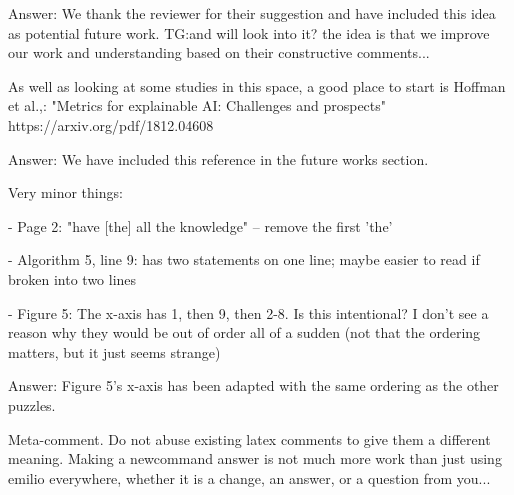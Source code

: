 \documentclass{article}
\newcommand\comment[1]{\marginpar{\tiny #1}}
\renewcommand\comment[1]{#1}
\newcommand{\tias}[1]{{\comment{\color{blue}\textsc{TG:}#1}}}
\newcommand{\emilio}[1]{{\comment{Answer: \color{red}#1}}}
\newcommand{\bart}[1]{{\comment{\color{green}#1}}}
\begin{document}
\emilio{We thank the reviewer for their suggestion and have included this idea as potential future work.} \tias{and will look into it? the idea is that we improve our work and understanding based on their constructive comments...}


\begin{quoteit}
As well as looking at some studies in this space, a good place to start is Hoffman et al.,: "Metrics for explainable AI: Challenges and prospects" https://arxiv.org/pdf/1812.04608 
\end{quoteit}

\emilio{We have included this reference in the future works section.}

Very minor things:

- Page 2: "have [the] all the knowledge" -- remove the first 'the'

- Algorithm 5, line 9: has two statements on one line; maybe easier to
read if broken into two lines

- Figure 5: The x-axis has 1, then 9, then 2-8. Is this intentional? I
don't see a reason why they would be out of order all of a sudden (not
that the ordering matters, but it just seems strange)

\emilio{Figure 5's x-axis has been adapted with the same ordering as the other puzzles.}

\bart{Meta-comment. Do not abuse existing latex comments to give them a different meaning. Making a newcommand answer is not much more work than just using emilio everywhere, whether it is a change, an answer, or a question from you... }
\end{document}
